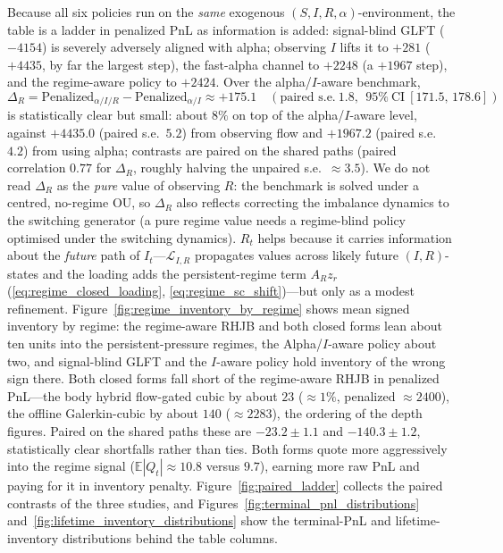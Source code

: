 \documentclass[11pt,a4paper]{article}
\newcommand{\E}{\mathbb{E}}
\theoremstyle{plain}
\theoremstyle{definition}
\begin{document}
Because all six policies run on the \emph{same} exogenous
\((S,I,R,\alpha)\)-environment, the table is a ladder in penalized PnL as
information is added: signal-blind GLFT (\(-4154\)) is severely adversely
aligned with alpha; observing \(I\) lifts it to \(+281\) (\(+4435\), by far the
largest step), the fast-alpha channel to \(+2248\) (a \(+1967\) step), and the
regime-aware policy to \(+2424\).  Over the alpha/\(I\)-aware benchmark,
\[
\Delta_R=\mathrm{Penalized}_{\alpha/I/R}-\mathrm{Penalized}_{\alpha/I}
\approx+175.1
\quad(\text{paired s.e.}\ 1.8,\ \ 95\%\ \text{CI}\ [171.5,\,178.6])
\]
is statistically clear but small: about \(8\%\) on top of the alpha/\(I\)-aware
level, against \(+4435.0\) (paired s.e.\ \(5.2\)) from observing flow and
\(+1967.2\) (paired s.e.\ \(4.2\)) from using alpha; contrasts are paired on the
shared paths (paired correlation \(0.77\) for \(\Delta_R\), roughly halving the
unpaired s.e.\ \(\approx3.5\)).  We do not read \(\Delta_R\) as the \emph{pure}
value of observing \(R\): the benchmark is solved under a centred, no-regime OU,
so \(\Delta_R\) also reflects correcting the imbalance dynamics to the switching
generator (a pure regime value needs a regime-blind policy optimised under the
switching dynamics).  \(R_t\) helps because it carries information about the
\emph{future} path of \(I_t\)---\(\mathcal{L}_{I,R}\) propagates values across
likely future \((I,R)\)-states and the loading adds the persistent-regime term
\(A_R z_r\) (\eqref{eq:regime_closed_loading}, \eqref{eq:regime_sc_shift})---but
only as a modest refinement.  Figure~\ref{fig:regime_inventory_by_regime} shows
mean signed inventory by regime: the regime-aware RHJB and both closed forms
lean about ten units into the persistent-pressure regimes, the Alpha/\(I\)-aware
policy about two, and signal-blind GLFT and the \(I\)-aware policy hold
inventory of the wrong sign there.  Both closed forms fall short of the regime-aware RHJB in penalized PnL---the
body hybrid flow-gated cubic by about \(23\) (\(\approx1\%\), penalized
\(\approx2400\)), the offline Galerkin-cubic by about \(140\)
(\(\approx2283\)), the ordering of the depth figures.  Paired on the shared
paths these are \(-23.2\pm1.1\) and \(-140.3\pm1.2\), statistically clear
shortfalls rather than ties.  Both forms quote more aggressively into the
regime signal (\(\E|Q_t|\approx10.8\) versus \(9.7\)), earning more raw PnL
and paying for it in inventory penalty.  Figure~\ref{fig:paired_ladder}
collects the paired contrasts of the three studies, and
Figures~\ref{fig:terminal_pnl_distributions}
and~\ref{fig:lifetime_inventory_distributions} show the terminal-PnL and
lifetime-inventory distributions behind the table columns.
\end{document}
